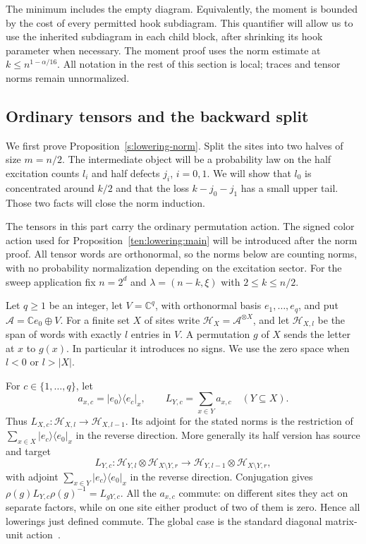 The minimum includes the empty diagram. Equivalently, the moment
is bounded by the cost of every permitted hook subdiagram. This
quantifier will allow us to use the inherited subdiagram in each
child block, after shrinking its hook parameter when necessary.
The moment proof uses the norm estimate at
$k\le n^{1-\alpha/16}$. All notation in the rest of this section
is local; traces and tensor norms remain unnormalized.

\subsection{Ordinary tensors and the backward split}

We first prove Proposition~\ref{s:lowering-norm}. Split the sites
into two halves of size $m=n/2$. The intermediate object will be a
probability law on the half excitation counts $l_i$ and half defects
$j_i$, $i=0,1$. We will show that $l_0$ is concentrated around $k/2$
and that the loss $k-j_0-j_1$ has a small upper tail. Those two
facts will close the norm induction.

The tensors in this part carry the ordinary permutation action.
The signed color action used for Proposition~\ref{ten:lowering:main}
will be introduced after the norm proof.
All tensor words are orthonormal, so the norms below are counting norms,
with no probability normalization depending on the excitation sector.
For the sweep application fix \(n=2^d\) and
\(\lambda=(n-k,\xi)\) with \(2\le k\le n/2\).

Let \(q\ge1\) be an integer, let \(V=\mathbb C^q\), with orthonormal
basis \(e_1,\ldots,e_q\), and put
\(\mathcal A=\mathbb C e_0\oplus V\).  For a finite set \(X\) of sites write
\(\mathcal H_X=\mathcal A^{\otimes X}\), and let
\(\mathcal H_{X,l}\) be the span of words with exactly \(l\) entries in
\(V\).  A permutation \(g\) of \(X\) sends the letter at \(x\) to \(g(x)\).
In particular it introduces no signs.  We use the zero space when \(l<0\)
or \(l>|X|\).

For \(c\in\{1,\ldots,q\}\), let
\[
 a_{x,c}=|e_0\rangle\langle e_c|_x,\qquad
 L_{Y,c}=\sum_{x\in Y}a_{x,c}\quad(Y\subseteq X).
\]
Thus \(L_{X,c}:\mathcal H_{X,l}\longrightarrow\mathcal H_{X,l-1}\).
Its adjoint for the stated norms is the restriction of
\(\sum_{x\in X}|e_c\rangle\langle e_0|_x\) in the reverse direction.
More generally its half version has source and target
\[
 L_{Y,c}:\mathcal H_{Y,l}\otimes\mathcal H_{X\setminus Y,r}
 \longrightarrow
 \mathcal H_{Y,l-1}\otimes\mathcal H_{X\setminus Y,r},
\]
with adjoint \(\sum_{x\in Y}|e_c\rangle\langle e_0|_x\) in the
reverse direction.  Conjugation gives
\(\rho(g)L_{Y,c}\rho(g)^{-1}=L_{gY,c}\).  All the \(a_{x,c}\)
commute: on different
sites they act on separate factors, while on one site either product of
two of them is zero.  Hence all lowerings just defined commute.  The global case is the
standard diagonal matrix-unit action~\cite[Theorem~4.55]{etingof}.

